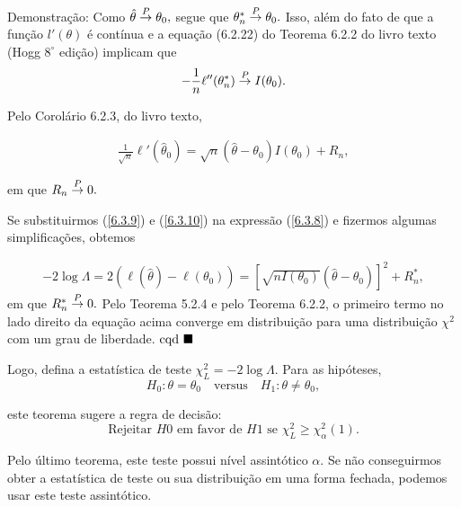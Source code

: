 \documentclass[12pt]{beamer}
\begin{document}
\begin{frame}{}
\begin{block}{Demonstração:}
\justifying
Como $\hat{\theta} \overset{P}{\rightarrow} \theta_0,$ segue que $\theta^*_n \overset{P}{\rightarrow} \theta_0.$ Isso, além do fato de que a função $l'(\theta)$ é contínua e a equação (6.2.22) do Teorema 6.2.2 do livro texto (Hogg $8^{\circ}$ edição) implicam que
\begin{align}\label{6.3.9}
    -\frac{1}{n}\ell''(\theta^{*}_{n}) \overset{P}{\rightarrow} I(\theta_0).
\end{align}

Pelo Corolário 6.2.3, do livro texto,

\begin{align}\label{6.3.10}
   \frac{1}{\sqrt{n}}\ell'(\hat{\theta}_{0}) = \sqrt{n}(\hat{\theta} - \theta_0)I(\theta_0) + R_n, 
\end{align}

em que $R_n \overset{P}{\rightarrow} 0.$ 

\end{block}
\end{frame}

\begin{frame}{}
\begin{block}{}
\justifying
Se substituirmos (\ref{6.3.9}) e (\ref{6.3.10}) na expressão (\ref{6.3.8}) e fizermos algumas simplificações, obtemos

\begin{align*}
    -2 \log \Lambda = 2(\ell(\hat{\theta}) - \ell(\theta_{0})) = \left[\sqrt{nI(\theta_0)}(\hat{\theta} - \theta_0)\right]^2 + R^*_n,
\end{align*}
em que $R^*_n \overset{P}{\rightarrow} 0.$ Pelo Teorema 5.2.4 e pelo Teorema 6.2.2, o primeiro termo no lado direito da equação acima converge em distribuição para uma distribuição $\chi^2$ com um grau de liberdade. $\text{cqd}~\blacksquare$
\end{block}
\end{frame}

\begin{frame}{}
\begin{block}{}
\justifying
Logo, defina a estatística de teste $\chi^2_L = -2 \log \Lambda.$ Para as hipóteses, 
\[ H_0 : \theta = \theta_0 \quad \text{versus} \quad H_1 : \theta \neq \theta_0, \]

este teorema sugere a regra de decisão:
\[
\text{Rejeitar } H0 \text{ em favor de } H1 \text{ se } \chi^2_L \geq \chi^2_\alpha(1).
\]

Pelo último teorema, este teste possui nível assintótico $\alpha.$ Se não conseguirmos obter a estatística de teste ou sua distribuição em uma forma fechada, podemos usar este teste assintótico.
\end{block}
\end{frame}
\end{document}
